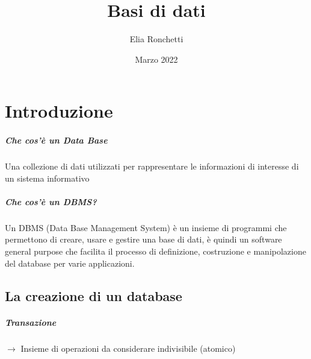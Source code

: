 \documentclass[12pt, a4paper, openany]{book}
\begin{document}
\title{Basi di dati}
\author{Elia Ronchetti}
\date{Marzo 2022}

\maketitle
\tableofcontents

\chapter{Introduzione}
\paragraph{Che cos'è un Data Base}
Una collezione di dati utilizzati per rappresentare le informazioni di interesse di un sistema informativo
\paragraph{Che cos'è un DBMS?}
Un DBMS (Data Base Management System) è un insieme di programmi che permettono di creare, usare e gestire una base di dati, è quindi un software
general purpose che facilita il processo di definizione, costruzione e manipolazione del database per varie applicazioni.

\section{La creazione di un database}
\paragraph{Transazione} $\to$ Insieme di operazioni da considerare indivisibile (atomico)
\end{document}
